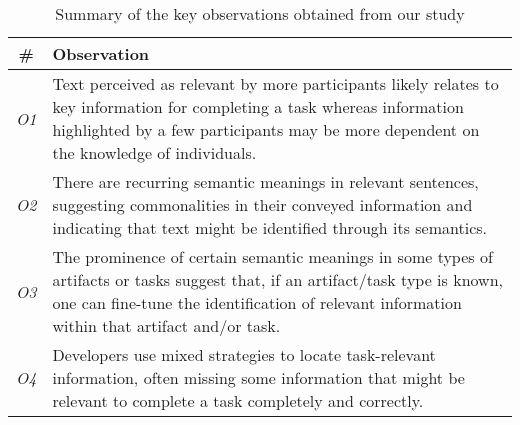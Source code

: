 \begin{table}
\caption{Summary of the key observations obtained from our study}
\begin{small}
\begin{threeparttable}
\begin{tabular}{cl}
\hline    
\textbf{\#}
& \textbf{Observation}\\
\hline    
\hline
% 
\textit{O1}  
& \parbox[c][2.1cm][c]{7.3cm}{
    Text perceived as relevant by more participants likely relates to key information for completing a task whereas information 
    highlighted by a few participants may be more dependent on the knowledge of individuals.
}
\\
% 
\textit{O2}
& \parbox[c][1.7cm][c]{7.3cm}{
    There are recurring semantic meanings in relevant sentences,
    suggesting commonalities in their conveyed information
    and indicating that text might be identified through its semantics.
}
\\
% 
\textit{O3} 
& \parbox[c][2.0cm][c]{7.3cm}{
    The prominence of certain semantic meanings in some types 
    of artifacts or tasks suggest that, if an artifact/task type is known,
    one can fine-tune the identification of relevant information within 
    that artifact and/or task.
}
\\
% 
\textit{O4}
& \parbox[c][1.7cm][c]{7.3cm}{
    Developers use mixed strategies to locate task-relevant information,
     often missing some information that might be relevant 
     to complete a task completely and correctly.
}
\\
\hline 
\end{tabular}
\end{threeparttable}  
\end{small}
\label{tbl:results-summary}
\end{table}
